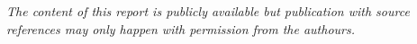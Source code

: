 \begin{nopagebreak}
\begin{multicols}{2}

    \vfill
    \columnbreak


  \end{multicols}
  \vfill

  \begin{center}
    \textit{The content of this report is publicly available but
    publication with source references may only happen with permission from
    the authours.}
  \end{center}
\end{nopagebreak}

